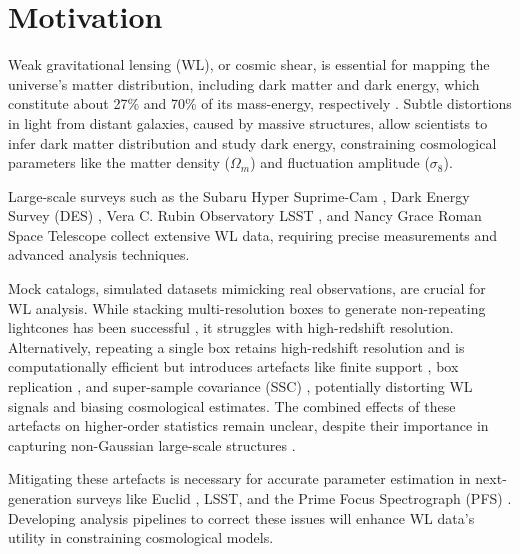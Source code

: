 \section{Motivation}
Weak gravitational lensing (WL), or cosmic shear, is essential for mapping the universe's matter distribution, including dark matter and dark energy, which constitute about 27\% and 70\% of its mass-energy, respectively \citep{2001PhR...340..291B, 2010CQGra..27w3001B, 1992grle.book.....S, 1998AJ....116.1009R,1999ApJ...517..565P, 2013MNRAS.432.2433H}. Subtle distortions in light from distant galaxies, caused by massive structures, allow scientists to infer dark matter distribution and study dark energy, constraining cosmological parameters like the matter density ($\Omega_m$) and fluctuation amplitude ($\sigma_8$).

Large-scale surveys such as the Subaru Hyper Suprime-Cam \citep{2018PASJ...70S...4A}, Dark Energy Survey (DES) \citep{2018ApJS..239...18A}, Vera C. Rubin Observatory LSST \citep{2019ApJ...873..111I}, and Nancy Grace Roman Space Telescope \citep{2015arXiv150303757S} collect extensive WL data, requiring precise measurements and advanced analysis techniques.

Mock catalogs, simulated datasets mimicking real observations, are crucial for WL analysis. While stacking multi-resolution boxes to generate non-repeating lightcones has been successful \citep{2015MNRAS.448.2987F, 2015MNRAS.453.1513C, 2017ApJ...850...24T, 2019ApJ...875...69D}, it struggles with high-redshift resolution. Alternatively, repeating a single box retains high-redshift resolution and is computationally efficient \citep{2010ApJ...709..920S, 2018JCAP...03..049L, 2020JCAP...10..012S, 2024MNRAS.530.5030O} but introduces artefacts like finite support \citep{2015MNRAS.450.2857H}, box replication \citep{2024MNRAS.534.1205C}, and super-sample covariance (SSC) \citep{2018JCAP...10..053B}, potentially distorting WL signals and biasing cosmological estimates. The combined effects of these artefacts on higher-order statistics remain unclear, despite their importance in capturing non-Gaussian large-scale structures \citep{2013PhRvD..88l3002P, 2015PhRvD..91j3511P, 2015PhRvD..91f3507L}.

Mitigating these artefacts is necessary for accurate parameter estimation in next-generation surveys like Euclid \citep{2010arXiv1001.0061R}, LSST, and the Prime Focus Spectrograph (PFS) \citep{2016SPIE.9908E..1MT}. Developing analysis pipelines to correct these issues will enhance WL data's utility in constraining cosmological models.

